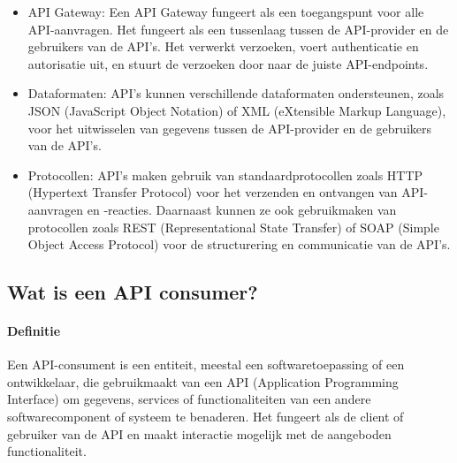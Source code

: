 \begin{itemize}
    \item API Gateway: Een API Gateway fungeert als een toegangspunt voor alle API-aanvragen. Het fungeert als een tussenlaag tussen de API-provider en de gebruikers van de API's. Het verwerkt verzoeken, voert authenticatie en autorisatie uit, en stuurt de verzoeken door naar de juiste API-endpoints.
    \item Dataformaten: API's kunnen verschillende dataformaten ondersteunen, zoals JSON (JavaScript Object Notation) of XML (eXtensible Markup Language), voor het uitwisselen van gegevens tussen de API-provider en de gebruikers van de API's.
    \item Protocollen: API's maken gebruik van standaardprotocollen zoals HTTP (Hypertext Transfer Protocol) voor het verzenden en ontvangen van API-aanvragen en -reacties. Daarnaast kunnen ze ook gebruikmaken van protocollen zoals REST (Representational State Transfer) of SOAP (Simple Object Access Protocol) voor de structurering en communicatie van de API's.
\end{itemize} \autocite{Cleo2023}

\subsection{Wat is een API consumer?}
\label{sec:Wat is een API consumer?}
\paragraph{Definitie}
Een API-consument is een entiteit, meestal een softwaretoepassing of een ontwikkelaar, die gebruikmaakt van een API (Application Programming Interface) om gegevens, services of functionaliteiten van een andere softwarecomponent of systeem te benaderen. Het fungeert als de client of gebruiker van de API en maakt interactie mogelijk met de aangeboden functionaliteit. \autocite{Cleo2023}

